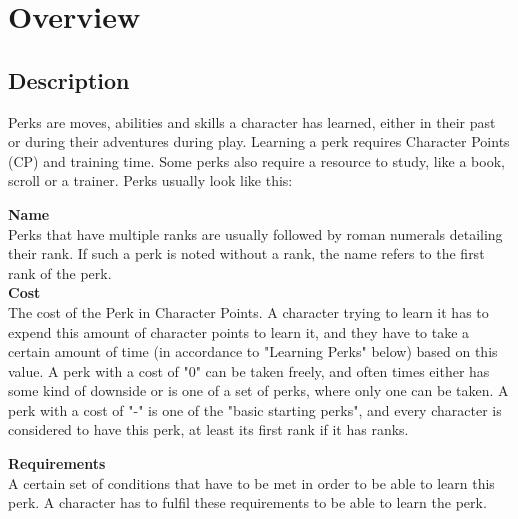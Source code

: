 \chapter{Overview}\label{ch:perksOverview}
\section{Description}\label{sec:perkDescription}
Perks are moves, abilities and skills a character has learned, either in their past or during their adventures during play.
Learning a perk requires Character Points (CP) and training time.
Some perks also require a resource to study, like a book, scroll or a trainer.
Perks usually look like this:

\textbf{Name}\\
Perks that have multiple ranks are usually followed by roman numerals detailing their rank.
If such a perk is noted without a rank, the name refers to the first rank of the perk.\\

\textbf{Cost}\\
The cost of the Perk in Character Points.
A character trying to learn it has to expend this amount of character points to learn it, and they have to take a certain amount of time (in accordance to "Learning Perks" below) based on this value. A perk with a cost of "0" can be taken freely, and often times either has some kind of downside or is one of a set of perks, where only one can be taken. A perk with a cost of "-" is one of the "basic starting perks", and every character is considered to have this perk, at least its first rank if it has ranks.

\textbf{Requirements}\\
A certain set of conditions that have to be met in order to be able to learn this perk.
A character has to fulfil these requirements to be able to learn the perk.


